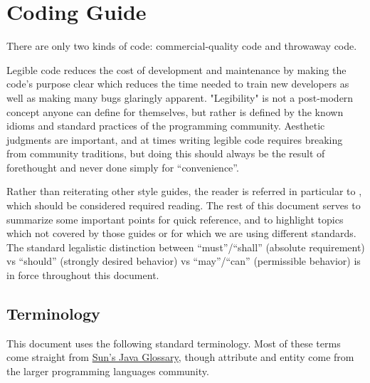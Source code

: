 \section{Coding Guide}

There are only two kinds of code: commercial-quality code and throwaway code. 

Legible code reduces the cost of development and maintenance by making the code's purpose clear which reduces the time needed to train new developers as well as making many bugs glaringly apparent. "Legibility" is not a post-modern concept anyone can define for themselves, but rather is defined by the known idioms and standard practices of the programming community. Aesthetic judgments are important, and at times writing legible code requires breaking from community traditions, but doing this should always be the result of forethought and never done simply for ``convenience''.

Rather than reiterating other style guides, the reader is referred in particular to \cite{ambysoft,geosoft}, which should be considered required reading. The rest of this document serves to summarize some important points for quick reference, and to highlight topics which not covered by those guides or for which we are using different standards. The standard legalistic distinction between ``must''/``shall'' (absolute requirement) vs ``should'' (strongly desired behavior) vs ``may''/``can'' (permissible behavior) is in force throughout this document. 


\subsection{Terminology}

This document uses the following standard terminology. Most of these terms come straight from \href{http://java.sun.com/docs/glossary.html}{Sun's Java Glossary}, though attribute and entity come from the larger programming languages community. 

